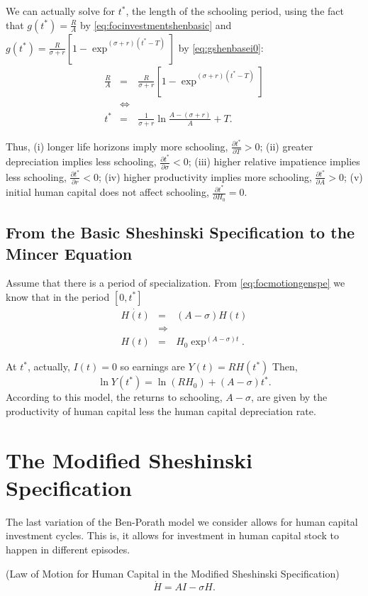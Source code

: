 \indent We can actually solve for $t^*$, the length of the schooling period, using the fact that $g(t^*) = \frac{R}{A} $ by \eqref{eq:focinvestmentshenbasic} and $g(t^*) = \frac{R}{\sigma + r} \left[1 - \exp^{(\sigma + r)(t^*-T)} \right]$ by \eqref{eq:gshenbasei0}:
\begin{eqnarray}
\frac{R}{A} &=& \frac{R}{\sigma + r} \left[1 - \exp^{(\sigma + r)(t^*-T)} \right] \nonumber \\
&\Leftrightarrow& \nonumber \\ 
t^* &=& \frac{1}{\sigma + r} \ln \frac{A - (\sigma + r) }{A} + T.
\end{eqnarray}

\indent Thus, (i) longer life horizons imply more schooling, $\frac{\partial t^*}{\partial T} > 0$; (ii) greater depreciation implies less schooling, $\frac{\partial t^*}{\partial \sigma} < 0$; (iii) higher relative impatience implies less schooling, $\frac{\partial t^*}{\partial r} < 0$; (iv) higher productivity implies more schooling, $\frac{\partial t^*}{\partial A} > 0$; (v) initial human capital does not affect schooling, $\frac{\partial t^*}{\partial H_{0}} = 0$.

\subsection{From the Basic Sheshinski Specification to the Mincer Equation}
Assume that there is a period of specialization. From \eqref{eq:focmotiongenspe} we know that in the period $[0,t^*]$
\begin{eqnarray}
\dot{H(t)} &=& (A - \sigma)H(t) \nonumber \\
&\Rightarrow& \nonumber \\ 
H(t) &=& H_{0} \exp^{(A - \sigma)t}.
\end{eqnarray}

\noindent At $t^*$, actually, $I(t) = 0$ so earnings are $Y(t) = R H(t^*)$ Then,
\begin{equation}
\ln Y(t^*) = \ln(RH_{0}) + (A - \sigma)t^*.
\end{equation} 
\noindent According to this model, the returns to schooling, $A-\sigma$, are given by the productivity of human capital less the human capital depreciation rate.  

\section{The Modified Sheshinski Specification}
The last variation of the Ben-Porath model we consider allows for human capital investment cycles. This is, it allows for investment in human capital stock to happen in different episodes.\\
\begin{definition} (Law of Motion for Human Capital in the Modified Sheshinski Specification)\\
\begin{equation}
\dot{H} = AI - \sigma H. \label{eq:modshenlaw}
\end{equation}
\end{definition}

